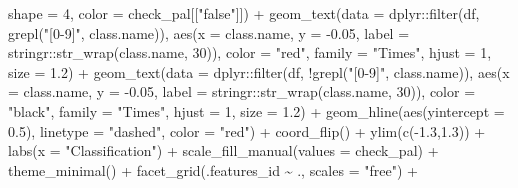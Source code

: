\documentclass[
]{article}
\newenvironment{Shaded}{\begin{snugshade}}{\end{snugshade}}
\newcommand{\AttributeTok}[1]{\textcolor[rgb]{0.77,0.63,0.00}{#1}}
\newcommand{\DecValTok}[1]{\textcolor[rgb]{0.00,0.00,0.81}{#1}}
\newcommand{\FloatTok}[1]{\textcolor[rgb]{0.00,0.00,0.81}{#1}}
\newcommand{\FunctionTok}[1]{\textcolor[rgb]{0.00,0.00,0.00}{#1}}
\newcommand{\NormalTok}[1]{#1}
\newcommand{\SpecialCharTok}[1]{\textcolor[rgb]{0.00,0.00,0.00}{#1}}
\newcommand{\StringTok}[1]{\textcolor[rgb]{0.31,0.60,0.02}{#1}}
\begin{document}
\begin{Shaded}
\begin{Highlighting}[]
    \AttributeTok{shape =} \DecValTok{4}\NormalTok{, }\AttributeTok{color =}\NormalTok{ check\_pal[[}\StringTok{"false"}\NormalTok{]]) }\SpecialCharTok{+}
  \FunctionTok{geom\_text}\NormalTok{(}\AttributeTok{data =}\NormalTok{ dplyr}\SpecialCharTok{::}\FunctionTok{filter}\NormalTok{(df, }\FunctionTok{grepl}\NormalTok{(}\StringTok{"[0{-}9]"}\NormalTok{, class.name)),}
    \FunctionTok{aes}\NormalTok{(}\AttributeTok{x =}\NormalTok{ class.name, }\AttributeTok{y =} \SpecialCharTok{{-}}\FloatTok{0.05}\NormalTok{, }\AttributeTok{label =}\NormalTok{ stringr}\SpecialCharTok{::}\FunctionTok{str\_wrap}\NormalTok{(class.name, }\DecValTok{30}\NormalTok{)),}
    \AttributeTok{color =} \StringTok{"red"}\NormalTok{,}
    \AttributeTok{family =} \StringTok{"Times"}\NormalTok{, }\AttributeTok{hjust =} \DecValTok{1}\NormalTok{, }\AttributeTok{size =} \FloatTok{1.2}\NormalTok{) }\SpecialCharTok{+}
  \FunctionTok{geom\_text}\NormalTok{(}\AttributeTok{data =}\NormalTok{ dplyr}\SpecialCharTok{::}\FunctionTok{filter}\NormalTok{(df, }\SpecialCharTok{!}\FunctionTok{grepl}\NormalTok{(}\StringTok{"[0{-}9]"}\NormalTok{, class.name)),}
    \FunctionTok{aes}\NormalTok{(}\AttributeTok{x =}\NormalTok{ class.name, }\AttributeTok{y =} \SpecialCharTok{{-}}\FloatTok{0.05}\NormalTok{, }\AttributeTok{label =}\NormalTok{ stringr}\SpecialCharTok{::}\FunctionTok{str\_wrap}\NormalTok{(class.name, }\DecValTok{30}\NormalTok{)),}
    \AttributeTok{color =} \StringTok{"black"}\NormalTok{,}
    \AttributeTok{family =} \StringTok{"Times"}\NormalTok{, }\AttributeTok{hjust =} \DecValTok{1}\NormalTok{, }\AttributeTok{size =} \FloatTok{1.2}\NormalTok{) }\SpecialCharTok{+}
  \FunctionTok{geom\_hline}\NormalTok{(}\FunctionTok{aes}\NormalTok{(}\AttributeTok{yintercept =} \FloatTok{0.5}\NormalTok{),}
    \AttributeTok{linetype =} \StringTok{"dashed"}\NormalTok{, }\AttributeTok{color =} \StringTok{"red"}\NormalTok{) }\SpecialCharTok{+}
  \FunctionTok{coord\_flip}\NormalTok{() }\SpecialCharTok{+}
  \FunctionTok{ylim}\NormalTok{(}\FunctionTok{c}\NormalTok{(}\SpecialCharTok{{-}}\FloatTok{1.3}\NormalTok{,}\FloatTok{1.3}\NormalTok{)) }\SpecialCharTok{+}
  \FunctionTok{labs}\NormalTok{(}\AttributeTok{x =} \StringTok{"Classification"}\NormalTok{) }\SpecialCharTok{+}
  \FunctionTok{scale\_fill\_manual}\NormalTok{(}\AttributeTok{values =}\NormalTok{ check\_pal) }\SpecialCharTok{+}
  \FunctionTok{theme\_minimal}\NormalTok{() }\SpecialCharTok{+}
  \FunctionTok{facet\_grid}\NormalTok{(.features\_id }\SpecialCharTok{\textasciitilde{}}\NormalTok{ ., }\AttributeTok{scales =} \StringTok{"free"}\NormalTok{) }\SpecialCharTok{+}

\end{Highlighting}
\end{Shaded}
\end{document}
